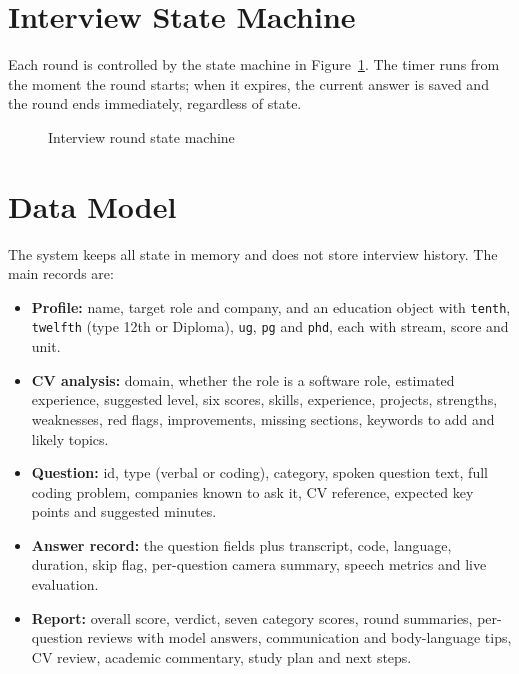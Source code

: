 \documentclass[12pt,a4paper,oneside]{report}
\begin{document}
\section{Interview State Machine}
Each round is controlled by the state machine in Figure~\ref{fig:fsm}. The timer runs from the moment the round starts; when it expires, the current answer is saved and the round ends immediately, regardless of state.

\begin{figure}[H]
\centering
{}
\caption{Interview round state machine}
\label{fig:fsm}
\end{figure}

\section{Data Model}
The system keeps all state in memory and does not store interview history. The main records are:
\begin{itemize}
  \item \textbf{Profile:} name, target role and company, and an education object with \texttt{tenth}, \texttt{twelfth} (type 12th or Diploma), \texttt{ug}, \texttt{pg} and \texttt{phd}, each with stream, score and unit.
  \item \textbf{CV analysis:} domain, whether the role is a software role, estimated experience, suggested level, six scores, skills, experience, projects, strengths, weaknesses, red flags, improvements, missing sections, keywords to add and likely topics.
  \item \textbf{Question:} id, type (verbal or coding), category, spoken question text, full coding problem, companies known to ask it, CV reference, expected key points and suggested minutes.
  \item \textbf{Answer record:} the question fields plus transcript, code, language, duration, skip flag, per-question camera summary, speech metrics and live evaluation.
  \item \textbf{Report:} overall score, verdict, seven category scores, round summaries, per-question reviews with model answers, communication and body-language tips, CV review, academic commentary, study plan and next steps.
\end{itemize}
\end{document}
